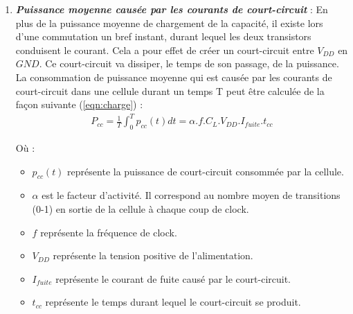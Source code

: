 \documentclass[oneside]{book}
\begin{document}
\begin{enumerate}
\vspace{-0.2 cm}\item \textbf{\textit{Puissance moyenne causée par les courants de court-circuit}} : En plus de la puissance moyenne de chargement de la capacité, il existe lors d'une commutation un bref instant, durant lequel les deux transistors conduisent le courant. Cela a pour effet de créer un court-circuit entre $V_{DD}$ en $GND$. Ce court-circuit va dissiper, le temps de son passage, de la puissance. La consommation de puissance moyenne qui est causée par les courants de court-circuit dans une cellule durant un temps T peut être calculée de la façon suivante (\ref{eqn:charge}) :
\begin{gather}
	P_{cc} = \frac{1}{T}\int_{0}^{T}p_{cc}(t)dt=\alpha.f.C_{L}.V_{DD}.I_{fuite}.t_{cc}
\end{gather}

Où : 
\begin{itemize}
\item $p_{cc}(t)$ représente la puissance de court-circuit consommée par la cellule.
\item $\alpha$ est le facteur d'activité. Il correspond au nombre moyen de transitions (0-1) en sortie de la cellule à chaque coup de clock.
\item $f$ représente la fréquence de clock.
\item $V_{DD}$ représente la tension positive de l'alimentation.
\item $I_{fuite}$ représente le courant de fuite causé par le court-circuit.
\item $t_{cc}$ représente le temps durant lequel le court-circuit se produit.
\end{itemize}

\end{enumerate}

\hspace{-0.5 cm}
\end{document}
